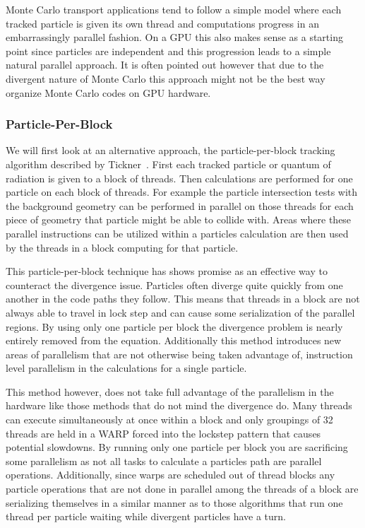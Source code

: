 %
Monte Carlo transport applications tend to follow a simple model where each tracked particle is given its own thread and computations progress in an embarrassingly parallel fashion. 
%
On a GPU this also makes sense as a starting point since particles are independent and this progression leads to a simple natural parallel approach.
%
It is often pointed out however that due to the divergent nature of Monte Carlo this approach might not be the best way organize Monte Carlo codes on GPU hardware.
%

\subsubsection*{\textbf{Particle-Per-Block}}
We will first look at an alternative approach, the particle-per-block tracking algorithm described by Tickner~\cite{tickner2010monte}.
%
First each tracked particle or quantum of radiation is given to a block of threads.
%
Then calculations are performed for one particle on each block of threads.
%
For example the particle intersection tests with the background geometry can be performed in parallel on those threads for each piece of geometry that particle might be able to collide with.
%
Areas where these parallel instructions can be utilized within a particles calculation are then used by the threads in a block computing for that particle.
%

This particle-per-block technique has shows promise as an effective way to counteract the divergence issue.
%
Particles often diverge quite quickly from one another in the code paths they follow.
%
This means that threads in a block are not always able to travel in lock step and can cause some serialization of the parallel regions.
%
By using only one particle per block the divergence problem is nearly entirely removed from the equation.
%
Additionally this method introduces new areas of parallelism that are not otherwise being taken advantage of, instruction level parallelism in the calculations for a single particle.
%

%
This method however, does not take full advantage of the parallelism in the hardware like those methods that do not mind the divergence do.
%
Many threads can execute simultaneously at once within a block and only groupings of 32 threads are held in a WARP forced into the lockstep pattern that causes potential slowdowns.
%
By running only one particle per block you are sacrificing some parallelism as not all tasks to calculate a particles path are parallel operations.
%
Additionally, since warps are scheduled out of thread blocks any particle operations that are not done in parallel among the threads of a block are serializing themselves in a similar manner as to those algorithms that run one thread per particle waiting while divergent particles have a turn.
%

